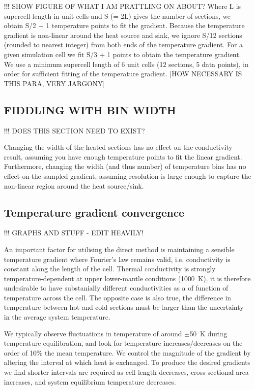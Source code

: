 !!! SHOW FIGURE OF WHAT I AM PRATTLING ON ABOUT? Where L is supercell length in unit cells and S (= 2L) gives the number of sections, we obtain S/2 + 1 temperature points to fit the gradient. Because the temperature gradient is non-linear around the heat source and sink, we ignore S/12 sections (rounded to nearest integer) from both ends of the temperature gradient. For a given simulation cell we fit S/3 + 1 points to obtain the temperature gradient. We use a minimum supercell length of 6 unit cells (12 sections, 5 data points), in order for sufficient fitting of the temperature gradient. [HOW NECESSARY IS THIS PARA, VERY JARGONY]


\subsection{\label{sec:3.DM.bin}FIDDLING WITH BIN WIDTH}

!!! DOES THIS SECTION NEED TO EXIST?

Changing the width of the heated sections has no effect on the conductivity result, assuming you have enough temperature points to fit the linear gradient. Furthermore, changing the width (and thus number) of temperature bins has no effect on the sampled gradient, assuming resolution is large enough to capture the non-linear region around the heat source/sink. %


\subsection{\label{sec:3.DM.grad}Temperature gradient convergence}

!!! GRAPHS AND STUFF - EDIT HEAVILY!

An important factor for utilising the direct method is maintaining a sensible temperature gradient where Fourier's law remains valid, i.e. conductivity is constant along the length of the cell. Thermal conductivity is strongly temperature-dependent at upper lower-mantle conditions (1000~K), it is therefore undesirable to have substanially different conductivities as a of function of temperature across the cell. The opposite case is also true, the difference in temperature between hot and cold sections must be larger than the uncertainty in the average system temperature. 

We typically observe fluctuations in temperature of around $\pm$50~K during temperature equilibration, and look for temperature increases/decreases on the order of 10\% the mean temperature. We control the magnitude of the gradient by altering the interval at which heat is exchanged. To produce the desired gradients we find shorter intervals are required as cell length decreases, cross-sectional area increases, and system equilibrium temperature decreases.


